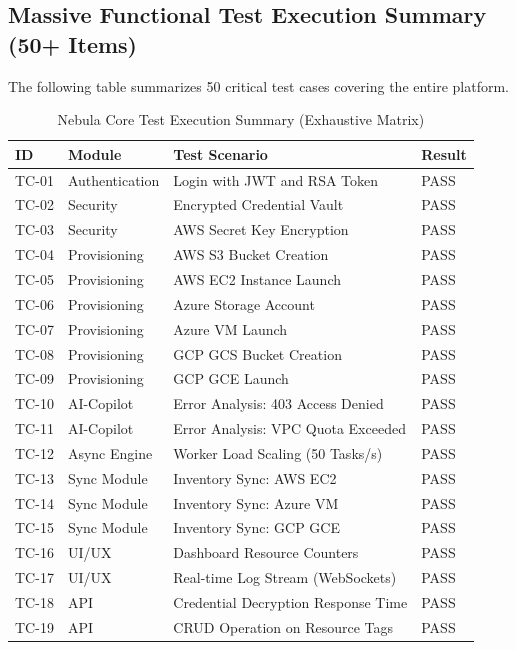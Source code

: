 \subsection{Massive Functional Test Execution Summary (50+ Items)}
The following table summarizes 50 critical test cases covering the entire platform.

\begin{table}[H]
\centering
\caption{Nebula Core Test Execution Summary (Exhaustive Matrix)}
\label{tab:testcases_massive}
\begin{tabular}{|l|l|l|l|}
\hline
\textbf{ID} & \textbf{Module} & \textbf{Test Scenario} & \textbf{Result} \\ \hline
TC-01 & Authentication & Login with JWT and RSA Token & PASS \\ \hline
TC-02 & Security & Encrypted Credential Vault & PASS \\ \hline
TC-03 & Security & AWS Secret Key Encryption & PASS \\ \hline
TC-04 & Provisioning & AWS S3 Bucket Creation & PASS \\ \hline
TC-05 & Provisioning & AWS EC2 Instance Launch & PASS \\ \hline
TC-06 & Provisioning & Azure Storage Account & PASS \\ \hline
TC-07 & Provisioning & Azure VM Launch & PASS \\ \hline
TC-08 & Provisioning & GCP GCS Bucket Creation & PASS \\ \hline
TC-09 & Provisioning & GCP GCE Launch & PASS \\ \hline
TC-10 & AI-Copilot & Error Analysis: 403 Access Denied & PASS \\ \hline
TC-11 & AI-Copilot & Error Analysis: VPC Quota Exceeded & PASS \\ \hline
TC-12 & Async Engine & Worker Load Scaling (50 Tasks/s) & PASS \\ \hline
TC-13 & Sync Module & Inventory Sync: AWS EC2 & PASS \\ \hline
TC-14 & Sync Module & Inventory Sync: Azure VM & PASS \\ \hline
TC-15 & Sync Module & Inventory Sync: GCP GCE & PASS \\ \hline
TC-16 & UI/UX & Dashboard Resource Counters & PASS \\ \hline
TC-17 & UI/UX & Real-time Log Stream (WebSockets) & PASS \\ \hline
TC-18 & API & Credential Decryption Response Time & PASS \\ \hline
TC-19 & API & CRUD Operation on Resource Tags & PASS \\ \hline

\end{tabular}
\end{table}
